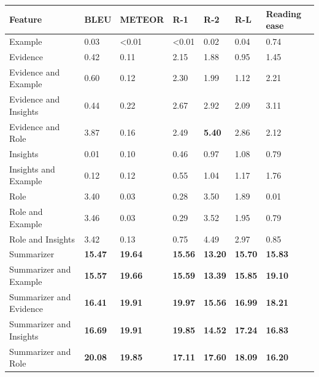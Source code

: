 \begin{tabular}{|l|l|l|l|l|l|l|}
\hline
\textbf{Feature} & BLEU & METEOR & R-1 & R-2 & R-L & Reading ease \\
 \hline
 Example & 0.03 & \textless{}0.01 & \textless{}0.01 & 0.02 & 0.04 & 0.74 \\
 \hline
 Evidence & 0.42 & 0.11 & 2.15 & 1.88 & 0.95 & 1.45 \\
 \hline
 Evidence and Example & 0.60 & 0.12 & 2.30 & 1.99 & 1.12 & 2.21 \\
 \hline
 Evidence and Insights & 0.44 & 0.22 & 2.67 & 2.92 & 2.09 & 3.11 \\
 \hline
 Evidence and Role & 3.87 & 0.16 & 2.49 & \textbf{5.40} & 2.86 & 2.12 \\
 \hline
 Insights & 0.01 & 0.10 & 0.46 & 0.97 & 1.08 & 0.79 \\
 \hline
 Insights and Example & 0.12 & 0.12 & 0.55 & 1.04 & 1.17 & 1.76 \\
 \hline
 Role & 3.40 & 0.03 & 0.28 & 3.50 & 1.89 & 0.01 \\
 \hline
 Role and Example & 3.46 & 0.03 & 0.29 & 3.52 & 1.95 & 0.79 \\
 \hline
 Role and Insights & 3.42 & 0.13 & 0.75 & 4.49 & 2.97 & 0.85 \\
 \hline
 Summarizer & \textbf{15.47} & \textbf{19.64} & \textbf{15.56} & \textbf{13.20} & \textbf{15.70} & \textbf{15.83} \\
 \hline
 Summarizer and Example & \textbf{15.57} & \textbf{19.66} & \textbf{15.59} & \textbf{13.39} & \textbf{15.85} & \textbf{19.10} \\
 \hline
 Summarizer and Evidence & \textbf{16.41} & \textbf{19.91} & \textbf{19.97} & \textbf{15.56} & \textbf{16.99} & \textbf{18.21} \\
 \hline
 Summarizer and Insights & \textbf{16.69} & \textbf{19.91} & \textbf{19.85} & \textbf{14.52} & \textbf{17.24} & \textbf{16.83} \\
 \hline
 Summarizer and Role & \textbf{20.08} & \textbf{19.85} & \textbf{17.11} & \textbf{17.60} & \textbf{18.09} & \textbf{16.20} \\
\hline
\end{tabular}
